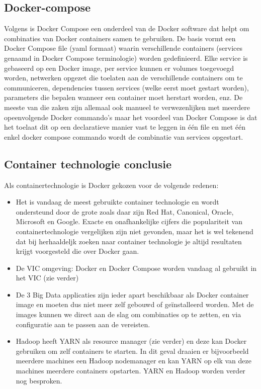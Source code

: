 \subsection{Docker-compose}
Volgens \textcite{Docker2023} is Docker Compose een onderdeel van de Docker software dat helpt om combinaties van Docker containers samen te gebruiken. De basis vormt een Docker Compose file (yaml formaat) waarin verschillende containers (services genaamd in Docker Compose terminologie) worden gedefinieerd. Elke service is gebaseerd op een Docker image, per service kunnen er volumes toegevoegd worden, netwerken opgezet die toelaten aan de verschillende containers om te communiceren, dependencies tussen services (welke eerst moet gestart worden), parameters die bepalen wanneer een container moet herstart worden, enz.
\newline
\newline
De meeste van die zaken zijn allemaal ook manueel te verwezenlijken met meerdere opeenvolgende Docker commando's maar het voordeel van Docker Compose is dat het toelaat dit op een declaratieve manier vast te leggen in één file en met één enkel docker compose commando wordt de combinatie van services opgestart.
\newline
\newline

\subsection{Container technologie conclusie}
Als containertechnologie is Docker gekozen voor de volgende redenen:
\newline
\begin{itemize}
    \item Het is vandaag de meest gebruikte container technologie en wordt ondersteund door de grote zoals daar zijn Red Hat, Canonical, Oracle, Microsoft en Google. Exacte en onafhankelijke cijfers die populariteit van containertechnologie vergelijken zijn niet gevonden, maar het is wel tekenend dat bij herhaaldeljk zoeken naar container technologie je altijd resultaten krijgt voorgesteld die over Docker gaan.
    \item De VIC omgeving: Docker en Docker Compose worden vandaag al gebruikt in het VIC (zie verder)
    \item De 3 Big Data applicaties zijn ieder apart beschikbaar als Docker container image en moeten dus niet meer zelf gebouwd of geïnstalleerd worden. Met de images kunnen we direct aan de slag om combinaties op te zetten, en via configuratie aan te passen aan de vereisten.
    \item Hadoop heeft YARN als resource manager (zie verder) en deze kan Docker gebruiken om zelf containers te starten. In dit geval draaien er bijvoorbeeld meerdere machines een Hadoop nodemanager en kan YARN op elk van deze machines meerdere containers opstarten. YARN en Hadoop worden verder nog besproken. \autocite{Hadoop2023a}
\end{itemize}

